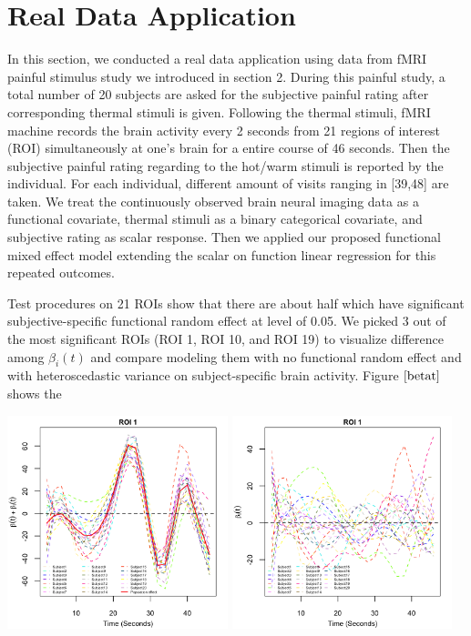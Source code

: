 \section{Real Data Application}
In this section, we conducted a real data application using data from fMRI painful stimulus study we introduced in section 2.  During this painful study, a total number of 20 subjects are asked for the subjective painful rating after corresponding thermal stimuli is given.  Following the thermal stimuli, fMRI machine records the brain activity every 2 seconds from 21 regions of interest (ROI) simultaneously at one's brain for a entire course of 46 seconds. Then the subjective painful rating regarding to the hot/warm stimuli is reported by the individual. For each individual, different amount of visits ranging in [39,48] are taken. We treat the continuously observed brain neural imaging data as a functional covariate, thermal stimuli as a binary categorical covariate,  and subjective rating as scalar response. Then  we applied our proposed functional mixed effect model extending the scalar on function linear
regression for this repeated outcomes.

Test procedures on 21 ROIs show that there are about half which have significant subjective-specific functional random effect at level of 0.05. We picked 3 out of the most significant ROIs (ROI 1, ROI 10, and ROI 19) to visualize difference among $\beta_i(t)$ and compare modeling them with no functional random effect and with heteroscedastic variance on subject-specific brain activity. Figure $\ref{betat}$ shows the

\includegraphics[width=0.48\textwidth]{ROI1_betat.png}
\includegraphics[width=0.48\textwidth]{ROI1_betait.png}


